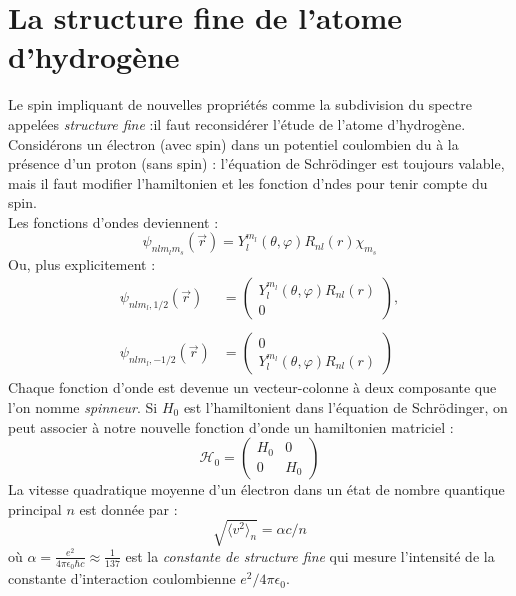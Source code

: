 \documentclass	[11pt, a4paper, openany]{book}
\begin{document}
	\section{La structure fine de l'atome d'hydrogène}
	Le spin impliquant de nouvelles propriétés comme la subdivision du spectre appelées 
	\textit{structure fine} :il faut reconsidérer l'étude de l'atome d'hydrogène.\\
	Considérons un électron (avec spin) dans un potentiel coulombien du à la présence 
	d'un proton (sans spin) : l'équation de Schrödinger est toujours valable, mais il 
	faut modifier l'hamiltonien et les fonction d'ndes pour tenir compte du spin.\\
	Les fonctions d'ondes deviennent : 
	\begin{equation}
	\psi_{nlm_lm_s}(\vec{r}) = Y_l^{m_l}(\theta,\varphi)R_{nl}(r)\chi_{m_s}
	\end{equation}
	Ou, plus explicitement :
	\begin{equation}
	\begin{array}{ll}
	\psi_{nlm_l,1/2}(\vec{r}) &= \left(\begin{array}{cc}
	Y_l^{m_l}(\theta,\varphi)R_{nl}(r)\\
	0
	\end{array}\right),\\
	 & \\
	\psi_{nlm_l,-1/2}(\vec{r}) &= \left(\begin{array}{cc}
	0\\
	Y_l^{m_l}(\theta,\varphi)R_{nl}(r)
	\end{array}\right)
	\end{array}
	\end{equation}
	Chaque fonction d'onde est devenue un vecteur-colonne à deux composante que l'on 
	nomme \textit{spinneur}. Si $H_0$ est l'hamiltonient dans l'équation de Schrödinger,
	on peut associer à notre nouvelle fonction d'onde un hamiltonien matriciel :
	\begin{equation}
	\mathcal{H}_0 =\left(\begin{array}{cc}
	H_0 & 0\\
	0 & H_0
	\end{array}\right)
	\end{equation}
	La vitesse quadratique moyenne d'un électron dans un état de nombre quantique 
	principal $n$ est donnée par :
	\begin{equation}
	\sqrt{\langle v^2\rangle_n} = \alpha c/n
	\end{equation}
	où $\alpha = \frac{e^2}{4\pi\epsilon_0\hbar c}	 \approx \frac{1}{137}$ est la \textit{
	constante de structure fine} qui mesure l'intensité de la constante d'interaction 
	coulombienne $e^2/4\pi\epsilon_0$.\\
	
\end{document}

